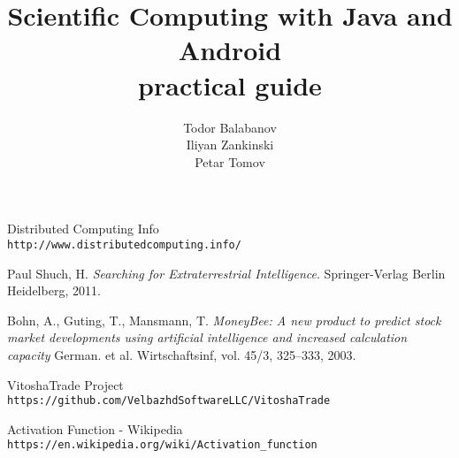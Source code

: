 \documentclass[book,12pt,twoside,openany]{memoir}
\title{Scientific Computing with Java and Android \\ practical guide}
\author{Todor Balabanov \\ Iliyan Zankinski \\ Petar Tomov}
\begin{document}
\maketitle

\thispagestyle{empty}

\newpage
{}

\newpage
\tableofcontents

\renewcommand\thesection{\thechapter.\arabic{section}}
\renewcommand\thesubsection{\thesection.\arabic{subsection}}











\newpage
\begin{thebibliography}{99}

 Distributed Computing Info \\\texttt{http://www.distributedcomputing.info/}

 Paul Shuch, H. \textit{Searching for Extraterrestrial Intelligence}. Springer-Verlag Berlin Heidelberg, 2011.

 Bohn, A., Guting, T., Mansmann, T. \textit{MoneyBee: A new product to predict stock market developments using artificial intelligence and increased calculation capacity} German. et al. Wirtschaftsinf, vol. 45/3, 325--333, 2003.

 VitoshaTrade Project \\\texttt{https://github.com/VelbazhdSoftwareLLC/VitoshaTrade}

 Activation Function - Wikipedia \\\texttt{https://en.wikipedia.org/wiki/Activation\_function}
\end{thebibliography}

\newpage
\listoffigures


\newpage
\printindex
\end{document}
